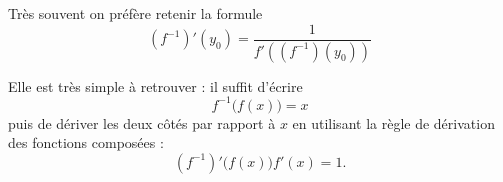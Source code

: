 \begin{normaltext}
 Très souvent on préfère retenir la formule
    \begin{equation}\label{EqWWAooBRFNsv}
      (f^{-1})'(y_0) = \frac{1}{f'\left((f^{-1})(y_0)\right)}
    \end{equation}

    Elle est très simple à retrouver : il suffit d'écrire
    \begin{equation}
        f^{-1}\big( f(x) \big)=x
    \end{equation}
    puis de dériver les deux côtés par rapport à \( x\) en utilisant la règle de dérivation des fonctions composées :
    \begin{equation}
        (f^{-1})'\big( f(x) \big)f'(x)=1.
    \end{equation}
\end{normaltext}

